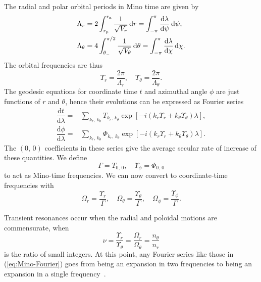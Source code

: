 \documentclass[aps,prd,amsfonts,amssymb,amsmath,nofootinbib,showpacs,superscriptaddress,twocolumn]{revtex4}
\newcommand{\eqnref}[1]{(\ref{eq:#1})}
\newcommand{\sub}[1]{\ensuremath{_\text{#1}}}
\newcommand{\dd}{\ensuremath{\mathrm{d}}}
\newcommand{\diff}[2]{\ensuremath{\dfrac{\dd {#1}}{\dd {#2}}}}
\newcommand{\intd}[4]{\ensuremath{\int_{#1}^{#2}{#3}\,\dd{#4}}}
\begin{document}
The radial and polar orbital periods in Mino time are given by
\begin{subequations}
\begin{align}
\Lambda_r = {} & 2\intd{r\sub{p}}{r\sub{a}}{\recip{\sqrt{V_r}}}{r} = \intd{-\pi}{\pi}{\diff{\lambda}{\psi}}{\psi}, \\
\Lambda_\theta = {} & 4\intd{\theta_-}{\pi/2}{\recip{\sqrt{V_\theta}}}{\theta} = \intd{-\pi}{\pi}{\diff{\lambda}{\chi}}{\chi}.
\end{align}
\end{subequations}
The orbital frequencies are thus
\begin{equation}
\Upsilon_r = \frac{2\pi}{\Lambda_r}, \quad \Upsilon_\theta = \frac{2\pi}{\Lambda_\theta}.
\end{equation}
The geodesic equations for coordinate time $t$ and azimuthal angle $\phi$ are just functions of $r$ and $\theta$, hence their evolutions can be expressed as Fourier series~\cite{Drasco2004}
\begin{subequations}
\begin{align}
\diff{t}{\lambda} = {} & \sum_{k_r,\,k_\theta}T_{k_r,\, k_\theta}\exp\left[-i\left(k_r\Upsilon_r + k_\theta\Upsilon_\theta\right)\lambda\right], \\
\diff{\phi}{\lambda} = {} & \sum_{k_r,\,k_\theta}\Phi_{k_r,\, k_\theta}\exp\left[-i\left(k_r\Upsilon_r + k_\theta\Upsilon_\theta\right)\lambda\right].
\label{eq:Mino-Fourier}
\end{align}
\end{subequations}
The $(0,\,0)$ coefficients in these series give the average secular rate of increase of these quantities. We define
\begin{equation}
\Gamma = T_{0,\,0}, \quad \Upsilon_\phi = \Phi_{0,\,0}
\end{equation}
to act as Mino-time frequencies. We can now convert to coordinate-time frequencies with
\begin{equation}
\Omega_r = \frac{\Upsilon_r}{\Gamma}, \quad \Omega_\theta = \frac{\Upsilon_\theta}{\Gamma}, \quad \Omega_\phi = \frac{\Upsilon_\phi}{\Gamma}.
\end{equation}

Transient resonances occur when the radial and poloidal motions are commensurate, when
\begin{equation}
\nu = \frac{\Upsilon_r}{\Upsilon_\theta} = \frac{\Omega_r}{\Omega_\theta} = \frac{n_\theta}{n_r}
\end{equation}
is the ratio of small integers. At this point, any Fourier series like those in \eqnref{Mino-Fourier} goes from being an expansion in two frequencies to being an expansion in a single frequency~\cite{Bosley1992}.
\end{document}

